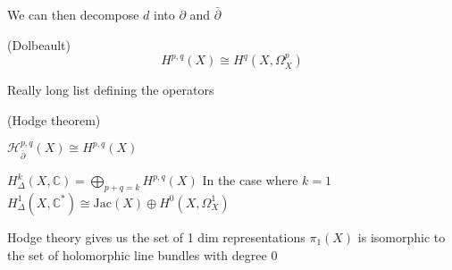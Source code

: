 We can then decompose $ d$ into $ \partial$ and $ \bar{\partial} $ 

\begin{theorem}
    (Dolbeault) 
    \begin{equation}
        H^{p,q} ( X) \cong H^q ( X, \Omega ^p _X ) 
    \end{equation}
\end{theorem}

Really long list defining the operators 

\begin{theorem}
    (Hodge theorem) 
\end{theorem}

\begin{theorem}
    $ \mathcal{H} ^{p,q} _{\bar{\partial} } (X) \cong H^{p,q} (X) $ 
\end{theorem}

\begin{theorem}
    $H^k _{\Delta } ( X, \mathbb{C} ) = \bigoplus _{p+q = k }  H^{p,q} ( X) $
    In the case where $ k = 1 $
    $H^1 _\Delta ( X, \mathbb{C}  ^* ) \cong \mathrm{Jac} (X) \oplus H^0 ( X, \Omega_X ^ 1) $
\end{theorem}


Hodge theory  gives us the set of 1 dim representations $\pi_1(X) $ is isomorphic to the set of holomorphic line bundles with degree 0 









 

